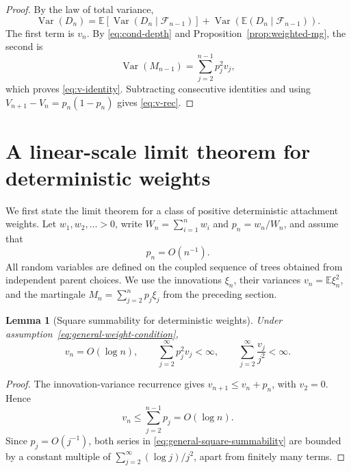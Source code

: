 \documentclass[11pt,a4paper]{article}
\newtheorem{lemma}[theorem]{Lemma}
\newcommand{\E}{\mathbb{E}}
\newcommand{\Var}{\operatorname{Var}}
\newcommand{\1}{\mathbf{1}}
\newcommand{\F}{\mathcal{F}}
\begin{document}
\begin{proof}
By the law of total variance,
\[
\Var(D_n)
=
\E\!\left[\Var(D_n\mid\F_{n-1})\right]
+
\Var\!\left(\E(D_n\mid\F_{n-1})\right).
\]
The first term is $v_n$.  By \eqref{eq:cond-depth} and
Proposition~\ref{prop:weighted-mg}, the second is
\[
\Var(M_{n-1})
=
\sum_{j=2}^{n-1}p_j^2v_j,
\]
which proves \eqref{eq:v-identity}. Subtracting consecutive identities and using
$V_{n+1}-V_n=p_n(1-p_n)$ gives \eqref{eq:v-rec}.
\end{proof}

\section{A linear-scale limit theorem for deterministic weights}
\label{sec:limit}

We first state the limit theorem for a class of positive deterministic
attachment weights.  Let $w_1,w_2,\ldots>0$, write
$W_n=\sum_{i=1}^n w_i$ and $p_n=w_n/W_n$, and assume that
\begin{equation}
  p_n=O(n^{-1}).
  \label{eq:general-weight-condition}
\end{equation}
All random variables are defined on the coupled sequence of trees obtained
from independent parent choices.  We use the innovations $\xi_n$, their
variances $v_n=\E\xi_n^2$, and the martingale
$M_n=\sum_{j=2}^n p_j\xi_j$ from the preceding section.

\begin{lemma}[Square summability for deterministic weights]
\label{lem:general-square-summability}
Under assumption~\eqref{eq:general-weight-condition},
\begin{equation}
  v_n=O(\log n),
  \qquad
  \sum_{j=2}^{\infty}p_j^2v_j<\infty,
  \qquad
  \sum_{j=2}^{\infty}\frac{v_j}{j^2}<\infty.
  \label{eq:general-square-summability}
\end{equation}
\end{lemma}

\begin{proof}
The innovation-variance recurrence gives
$v_{n+1}\le v_n+p_n$, with $v_2=0$.  Hence
\[
  v_n\le\sum_{j=2}^{n-1}p_j=O(\log n).
\]
Since $p_j=O(j^{-1})$, both series in
\eqref{eq:general-square-summability} are bounded by a constant multiple of
$\sum_{j=2}^{\infty}(\log j)/j^2$, apart from finitely many terms.
\end{proof}
\end{document}
